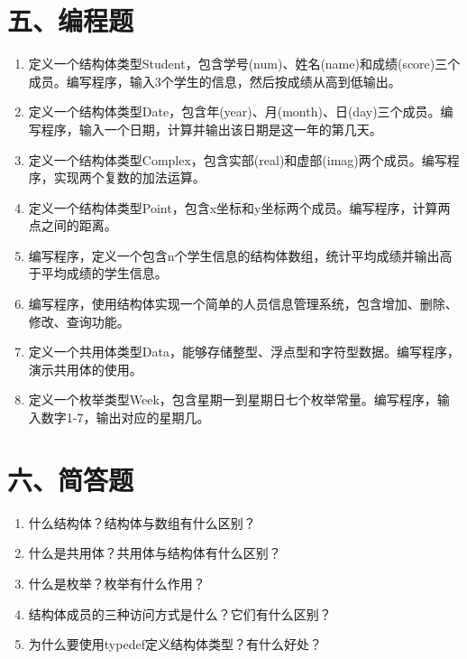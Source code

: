 \documentclass[a4paper,12pt]{article}
\begin{document}
\section*{五、编程题}

\begin{enumerate}
	\item 定义一个结构体类型Student，包含学号(num)、姓名(name)和成绩(score)三个成员。编写程序，输入3个学生的信息，然后按成绩从高到低输出。
	      \vspace{2cm}

	\item 定义一个结构体类型Date，包含年(year)、月(month)、日(day)三个成员。编写程序，输入一个日期，计算并输出该日期是这一年的第几天。
	      \vspace{2cm}

	\item 定义一个结构体类型Complex，包含实部(real)和虚部(imag)两个成员。编写程序，实现两个复数的加法运算。
	      \vspace{2cm}

	\item 定义一个结构体类型Point，包含x坐标和y坐标两个成员。编写程序，计算两点之间的距离。
	      \vspace{2cm}

	\item 编写程序，定义一个包含n个学生信息的结构体数组，统计平均成绩并输出高于平均成绩的学生信息。
	      \vspace{2cm}

	\item 编写程序，使用结构体实现一个简单的人员信息管理系统，包含增加、删除、修改、查询功能。
	      \vspace{2cm}

	\item 定义一个共用体类型Data，能够存储整型、浮点型和字符型数据。编写程序，演示共用体的使用。
	      \vspace{2cm}

	\item 定义一个枚举类型Week，包含星期一到星期日七个枚举常量。编写程序，输入数字1-7，输出对应的星期几。
	      \vspace{2cm}
\end{enumerate}

\section*{六、简答题}

\begin{enumerate}
	\item 什么结构体？结构体与数组有什么区别？
	      \vspace{1cm}

	\item 什么是共用体？共用体与结构体有什么区别？
	      \vspace{1cm}

	\item 什么是枚举？枚举有什么作用？
	      \vspace{1cm}

	\item 结构体成员的三种访问方式是什么？它们有什么区别？
	      \vspace{1cm}

	\item 为什么要使用typedef定义结构体类型？有什么好处？
	      \vspace{1cm}
\end{enumerate}
\end{document}
